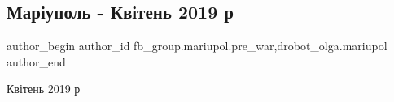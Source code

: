  
 
 
 
 

\subsection{Маріуполь - Квітень 2019 р}
\label{sec:22_01_2023.fb.fb_group.mariupol.pre_war.1.mar_upol___kv_ten_20}
 
\ifcmt
 author_begin
   author_id fb_group.mariupol.pre_war,drobot_olga.mariupol
 author_end
\fi

Квітень 2019 р
